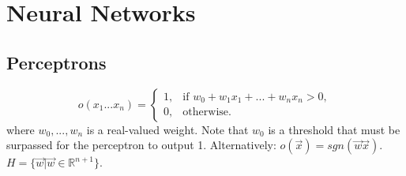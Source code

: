 \documentclass[11pt]{article}
\begin{document}
\section{Neural Networks}
\subsection{Perceptrons}
$$o(x_1...x_n) =
    \begin{cases}
            1, &         \text{if } w_0+w_1x_1+...+w_nx_n>0,\\
            0, &         \text{otherwise}.
    \end{cases}
$$
where $w_0,...,w_n$ is a real-valued weight. Note that $w_0$ is a threshold that must be surpassed for the perceptron to output 1. Alternatively: $o(\vec{x}) = sgn(\vec{w}\vec{x})$. $H =\{\vec{w} | \vec{w} \in \mathbb{R}^{n+1} \}$.
\end{document}
